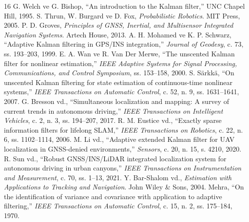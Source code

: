 ﻿\documentclass[conference]{IEEEtran}
\begin{document}
\begin{thebibliography}{16}
G. Welch ve G. Bishop, ``An introduction to the Kalman filter,'' UNC Chapel Hill, 1995.
S. Thrun, W. Burgard ve D. Fox, \emph{Probabilistic Robotics}. MIT Press, 2005.
P. D. Groves, \emph{Principles of GNSS, Inertial, and Multisensor Integrated Navigation Systems}. Artech House, 2013.
A. H. Mohamed ve K. P. Schwarz, ``Adaptive Kalman filtering in GPS/INS integration,'' \emph{Journal of Geodesy}, c. 73, ss. 193--203, 1999.
E. A. Wan ve R. Van Der Merwe, ``The unscented Kalman filter for nonlinear estimation,'' \emph{IEEE Adaptive Systems for Signal Processing, Communications, and Control Symposium}, ss. 153--158, 2000.
S. Särkkä, ``On unscented Kalman filtering for state estimation of continuous-time nonlinear systems,'' \emph{IEEE Transactions on Automatic Control}, c. 52, n. 9, ss. 1631--1641, 2007.
G. Bresson vd., ``Simultaneous localization and mapping: A survey of current trends in autonomous driving,'' \emph{IEEE Transactions on Intelligent Vehicles}, c. 2, n. 3, ss. 194--207, 2017.
R. M. Eustice vd., ``Exactly sparse information filters for lifelong SLAM,'' \emph{IEEE Transactions on Robotics}, c. 22, n. 6, ss. 1102--1114, 2006.
M. Li vd., ``Adaptive extended Kalman filter for UAV localization in GNSS-denied environments,'' \emph{Sensors}, c. 20, n. 15, s. 4210, 2020.
R. Sun vd., ``Robust GNSS/INS/LiDAR integrated localization system for autonomous driving in urban canyons,'' \emph{IEEE Transactions on Instrumentation and Measurement}, c. 70, ss. 1--13, 2021.
Y. Bar-Shalom vd., \emph{Estimation with Applications to Tracking and Navigation}. John Wiley \& Sons, 2004.
Mehra, ``On the identification of variance and covariance with application to adaptive filtering,'' \emph{IEEE Transactions on Automatic Control}, c. 15, n. 2, ss. 175--184, 1970.
\end{thebibliography}
\end{document}
